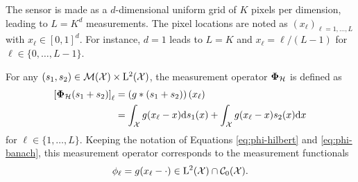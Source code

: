             The sensor is made as a $d$-dimensional uniform grid of $K$ pixels per dimension, leading to $L = K^d$ measurements. The pixel locations are noted as $(x_\ell)_{\ell = 1, \dots, L}$ with $x_\ell \in [0, 1]^d$. For instance, $d=1$ leads to $L=K$ and $x_\ell = {\ell}/({L-1})$ for $\ell \in \{0, \dots, L-1\}$.
        
            For any $(s_1, s_2) \in {\mathcal{M}}({\mathcal{X}}) \times \mathrm{L}^2(\mathcal{X})$, the measurement operator ${\bm{\Phi}_\mathcal{H}}$ is defined as 
            \begin{equation}
                \label{eq:phi-conv}
                \begin{split}
                \left[{\bm{\Phi}_\mathcal{H}}(s_1 + s_2)\right]_\ell &= \left(g*(s_1 + s_2)\right)(x_\ell) \\
                &= \int_{\mathcal{X}} g(x_\ell - x) \mathrm{d}s_1(x) + \int_{\mathcal{X}} g(x_\ell - x) s_2(x) \mathrm{d}x
                \end{split}
            \end{equation}
            for $\ell \in \{1, \dots, L\}$.
            Keeping the notation of Equations \eqref{eq:phi-hilbert} and \eqref{eq:phi-banach}, this measurement operator corresponds to the measurement functionals
            $$\phi_\ell = g(x_\ell - \cdot) \in \mathrm{L}^2(\mathcal{X}) \cap {\mathcal{C}}_0({\mathcal{X}}).$$

